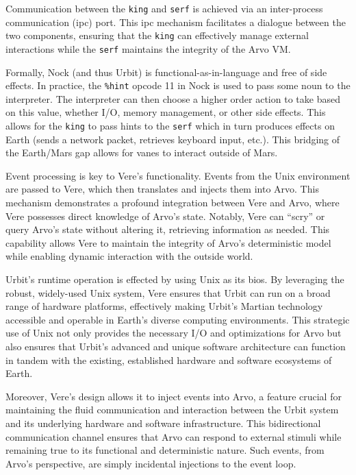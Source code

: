 \documentclass[twoside]{article}
\begin{document}
Communication between the \texttt{king} and \texttt{serf} is achieved via an inter-process communication ({\sc ipc}) port.  This {\sc ipc} mechanism facilitates a dialogue between the two components, ensuring that the \texttt{king} can effectively manage external interactions while the \texttt{serf} maintains the integrity of the Arvo VM.

Formally, Nock (and thus Urbit) is functional-as-in-language and free of side effects.  In practice, the \lstinline[style=inlinecode]{%hint} opcode 11 in Nock is used to pass some noun to the interpreter.  The interpreter can then choose a higher order action to take based on this value, whether I/O, memory management, or other side effects.  This allows for the \texttt{king} to pass hints to the \texttt{serf} which in turn produces effects on Earth (sends a network packet, retrieves keyboard input, etc.).  This bridging of the Earth/Mars gap allows for vanes to interact outside of Mars.

Event processing is key to Vere's functionality.  Events from the Unix environment are passed to Vere, which then translates and injects them into Arvo.  This mechanism demonstrates a profound integration between Vere and Arvo, where Vere possesses direct knowledge of Arvo's state.  Notably, Vere can ``scry'' or query Arvo's state without altering it, retrieving information as needed.  This capability allows Vere to maintain the integrity of Arvo's deterministic model while enabling dynamic interaction with the outside world.

Urbit's runtime operation is effected by using Unix as its {\sc bios}.  By leveraging the robust, widely-used Unix system, Vere ensures that Urbit can run on a broad range of hardware platforms, effectively making Urbit's Martian technology accessible and operable in Earth's diverse computing environments.  This strategic use of Unix not only provides the necessary I/O and optimizations for Arvo but also ensures that Urbit's advanced and unique software architecture can function in tandem with the existing, established hardware and software eco\-systems of Earth.

Moreover, Vere's design allows it to inject events into Arvo, a feature crucial for maintaining the fluid communication and interaction between the Urbit system and its underlying hardware and software infrastructure.  This bidirectional communication channel ensures that Arvo can respond to external stimuli while remaining true to its functional and deterministic nature.  Such events, from Arvo's perspective, are simply incidental injections to the event loop.
\end{document}
